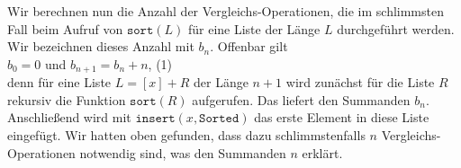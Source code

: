 Wir berechnen nun die Anzahl der
Vergleichs-Operationen, die im schlimmsten Fall beim Aufruf von $\texttt{sort}(L)$ f\"ur
eine Liste der L\"ange $L$ durchgef\"uhrt werden.  Wir bezeichnen dieses Anzahl mit $b_n$.
Offenbar gilt \\[0.2cm]
\hspace*{1.3cm} $b_0 = 0$ \quad und \quad $b_{n+1} = b_n + n$, \hspace*{\fill} (1)\\[0.2cm]
denn f\"ur eine Liste $L = [x] + R$ der L\"ange $n+1$ wird zun\"achst f\"ur die Liste $R$ rekursiv
die Funktion $\mathtt{sort}(R)$ aufgerufen. Das liefert den Summanden $b_n$. Anschlie{\ss}end wird
mit $\mathtt{insert}(x, \mathtt{Sorted})$ 
das erste Element in diese Liste eingef\"ugt.  Wir hatten oben gefunden, dass dazu
schlimmstenfalls $n$
Vergleichs-Operationen notwendig sind, was den Summanden $n$ erkl\"art.

